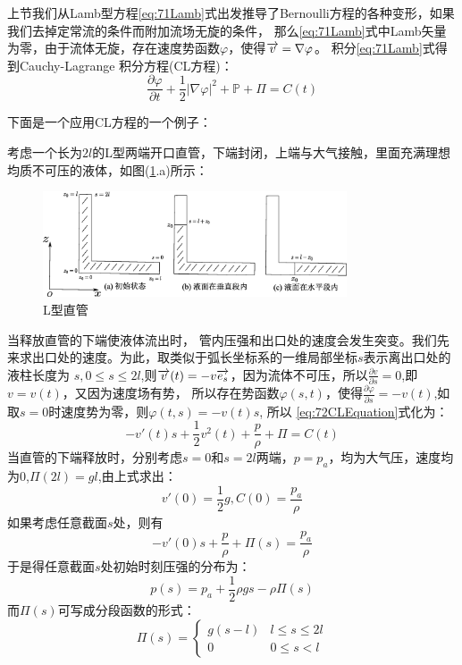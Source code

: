 上节我们从Lamb型方程\eqref{eq:71Lamb}式出发推导了Bernoulli方程的各种变形，如果我们去掉定常流的条件而附加流场无旋的条件，
那么\eqref{eq:71Lamb}式中Lamb矢量为零，由于流体无旋，存在速度势函数$\varphi$，使得$\overrightarrow{v}=\nabla \varphi$。
积分\eqref{eq:71Lamb}式得到Cauchy-Lagrange 积分方程(CL方程)：
\begin{equation}\label{eq:72CLEquation}
\frac{\partial \varphi}{\partial t}+\frac{1}{2} |\nabla \varphi|^2+\mathbb{P}+\Pi=C(t)
\end{equation}

下面是一个应用CL方程的一个例子：

考虑一个长为$2l$的L型两端开口直管，下端封闭，上端与大气接触，里面充满理想均质不可压的液体，如图(\ref{fig:72CL_integral_example}.a)所示：
\begin{figure}[!ht]
 \centering
 \includegraphics[width=9cm]{CL_integral_example.eps}
 \caption{L型直管}\label{fig:72CL_integral_example}
\end{figure}

当释放直管的下端使液体流出时，
管内压强和出口处的速度会发生突变。我们先来求出口处的速度。为此，取类似于弧长坐标系的一维局部坐标$s$表示离出口处的液柱长度为
$s,0\leq s\leq 2l$,则$\overrightarrow{v}(t)=-v\overrightarrow{e_s}$，因为流体不可压，所以$\frac{\partial v}{\partial s}=0$,即$v=v(t)$，又因为速度场有势，
所以存在势函数$\varphi(s,t)$，使得$\frac{\partial \varphi}{\partial s}=-v(t)$,如取$s=0$时速度势为零，则$\varphi(t,s)=-v(t)s$,
所以 \eqref{eq:72CLEquation}式化为：
\begin{equation}\label{eq:72CLEqExample}
-v'(t)s+\frac{1}{2}v^2(t)+\frac{p}{\rho}+\Pi=C(t)
\end{equation}
当直管的下端释放时，分别考虑$s=0$和$s=2l$两端，$p=p_a$，均为大气压，速度均为$0$,$\Pi(2l)=gl$,由上式求出：
\begin{equation}
v'(0)=\frac{1}{2}g,C(0)=\frac{p_a}{\rho}
\end{equation}
如果考虑任意截面$s$处，则有
\begin{equation}
-v'(0)s+\frac{p}{\rho}+\Pi(s)=\frac{p_a}{\rho}
\end{equation}
于是得任意截面$s$处初始时刻压强的分布为：
\begin{equation}
p(s)=p_a+\frac{1}{2}\rho g s-\rho \Pi(s)
\end{equation}
而$\Pi(s)$可写成分段函数的形式：
\begin{equation}
\Pi(s)=\begin{cases}
g(s-l) & l\leq s\leq 2l\\
0 & 0 \leq s < l
\end{cases}
\end{equation}

